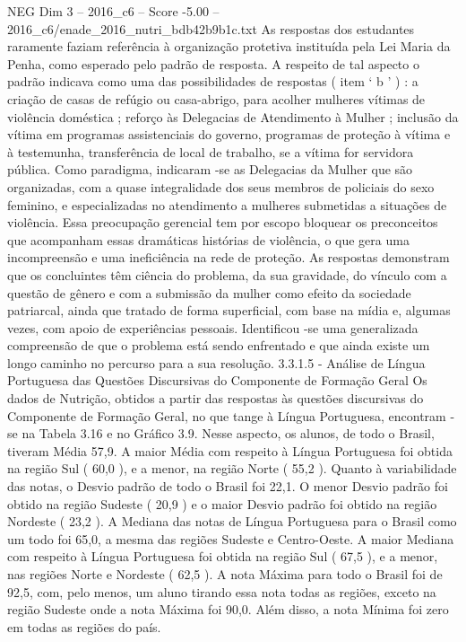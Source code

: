 \begin{textsample}{NEG Dim 3 – 2016\_c6 – Score -5.00 – 2016\_c6/enade\_2016\_nutri\_bdb42b9b1c.txt}
As respostas dos estudantes raramente faziam referência à organização protetiva instituída pela Lei Maria da Penha, como esperado pelo padrão de resposta.
A respeito de tal aspecto o padrão indicava como uma das possibilidades de respostas ( item ‘ b ’ ) : a criação de casas de refúgio ou casa-abrigo, para acolher mulheres vítimas de violência doméstica ; reforço às Delegacias de Atendimento à Mulher ; inclusão da vítima em programas assistenciais do governo, programas de proteção à vítima e à testemunha, transferência de local de trabalho, se a vítima for servidora pública.
Como paradigma, indicaram -se as Delegacias da Mulher que são organizadas, com a quase integralidade dos seus membros de policiais do sexo feminino, e especializadas no atendimento a mulheres submetidas a situações de violência.
Essa preocupação gerencial tem por escopo bloquear os preconceitos que acompanham essas dramáticas histórias de violência, o que gera uma incompreensão e uma ineficiência na rede de proteção.
As respostas demonstram que os concluintes têm ciência do problema, da sua gravidade, do vínculo com a questão de gênero e com a submissão da mulher como efeito da sociedade patriarcal, ainda que tratado de forma superficial, com base na mídia e, algumas vezes, com apoio de experiências pessoais.
Identificou -se uma generalizada compreensão de que o problema está sendo enfrentado e que ainda existe um longo caminho no percurso para a sua resolução. 3.3.1.5 - Análise de Língua Portuguesa das Questões Discursivas do Componente de Formação Geral Os dados de Nutrição, obtidos a partir das respostas às questões discursivas do Componente de Formação Geral, no que tange à Língua Portuguesa, encontram -se na Tabela 3.16 e no Gráfico 3.9.
Nesse aspecto, os alunos, de todo o Brasil, tiveram Média 57,9.
A maior Média com respeito à Língua Portuguesa foi obtida na região Sul ( 60,0 ), e a menor, na região Norte ( 55,2 ).
Quanto à variabilidade das notas, o Desvio padrão de todo o Brasil foi 22,1.
O menor Desvio padrão foi obtido na região Sudeste ( 20,9 ) e o maior Desvio padrão foi obtido na região Nordeste ( 23,2 ).
A Mediana das notas de Língua Portuguesa para o Brasil como um todo foi 65,0, a mesma das regiões Sudeste e Centro-Oeste.
A maior Mediana com respeito à Língua Portuguesa foi obtida na região Sul ( 67,5 ), e a menor, nas regiões Norte e Nordeste ( 62,5 ).
A nota Máxima para todo o Brasil foi de 92,5, com, pelo menos, um aluno tirando essa nota todas as regiões, exceto na região Sudeste onde a nota Máxima foi 90,0.
Além disso, a nota Mínima foi zero em todas as regiões do país.

\end{textsample}
